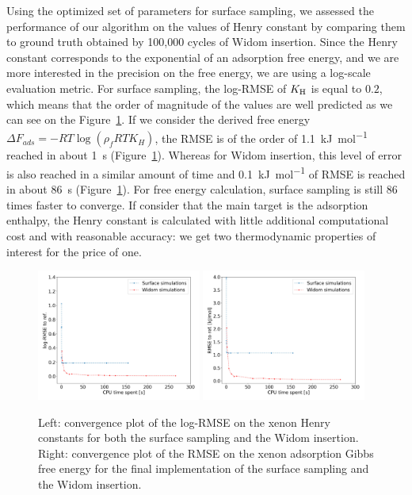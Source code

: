 \documentclass[main]{subfiles}
\begin{document}
Using the optimized set of parameters for surface sampling, we assessed the performance of our algorithm on the values of Henry constant by comparing them to ground truth obtained by 100,000 cycles of Widom insertion. Since the Henry constant corresponds to the exponential of an adsorption free energy, and we are more interested in the precision on the free energy, we are using a log-scale evaluation metric. For surface sampling, the log-RMSE of $K_{\text{H}}$ is equal to $0.2$, which means that the order of magnitude of the values are well predicted as we can see on the Figure~\ref{fgr:convergence_free_energy}. If we consider the derived free energy $\Delta F_{ads} = -RT \log(\rho_fRT K_H)$, the RMSE is of the order of \SI{1.1}{\kilo\joule\per\mole} reached in about \SI{1}{\second} (Figure~\ref{fgr:convergence_free_energy}). Whereas for Widom insertion, this level of error is also reached in a similar amount of time and \SI{0.1}{\kilo\joule\per\mole} of RMSE is reached in about \SI{86}{\second} (Figure~\ref{fgr:convergence_free_energy}). For free energy calculation, surface sampling is still 86 times faster to converge. If consider that the main target is the adsorption enthalpy, the Henry constant is calculated with little additional computational cost and with reasonable accuracy: we get two thermodynamic properties of interest for the price of one.

\begin{figure}[ht]
  \centering
  \includegraphics[width=0.48\textwidth]{figures/3-fastsim/log_henry_convergence.jpg}
  \includegraphics[width=0.48\textwidth]{figures/3-fastsim/gibbs_free_energy_convergence.jpg}
  \caption{ Left: convergence plot of the log-RMSE on the xenon Henry constants for both the surface sampling and the Widom insertion. Right: convergence plot of the RMSE on the xenon adsorption Gibbs free energy for the final implementation of the surface sampling and the Widom insertion. }\label{fgr:convergence_free_energy}
\end{figure}
\end{document}
